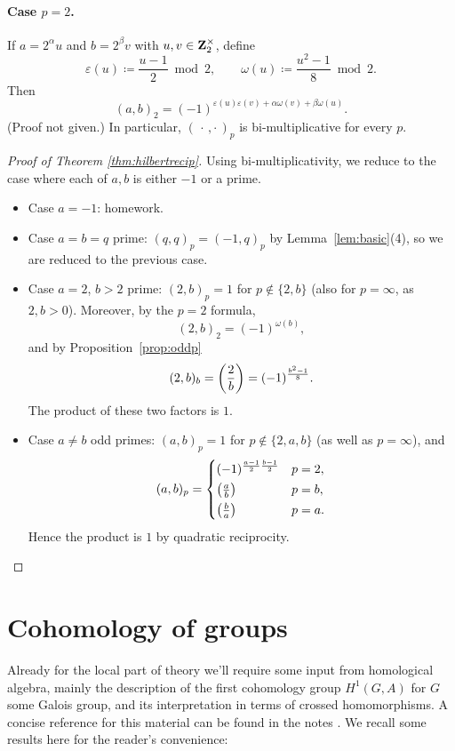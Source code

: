 \documentclass{article}
\begin{document}
\paragraph{Case $p=2$.}
If $a=2^\alpha u$ and $b=2^\beta v$ with $u,v\in\mathbf{Z}_2^\times$, define
\[
	\varepsilon(u)\coloneqq\frac{u-1}{2}\bmod 2,\qquad \omega(u)\coloneqq\frac{u^2-1}{8}\bmod 2.
\]
Then
\[
	(a,b)_2 = (-1)^{\varepsilon(u)\varepsilon(v)+\alpha\omega(v)+\beta\omega(u)}.
\]
(Proof not given.) In particular, $(\,\cdot\,,\cdot\,)_p$ is bi-multiplicative for every $p$.
\begin{proof}[Proof of Theorem \ref{thm:hilbertrecip}]
	Using bi-multiplicativity, we reduce to the case where each of $a,b$ is either $-1$ or a prime.
	\begin{itemize}
		\item Case $a=-1$: homework.
		\item Case $a=b=q$ prime: $(q,q)_p=(-1,q)_p$ by Lemma~\ref{lem:basic}(4), so we are reduced to the previous case.
		\item Case $a=2$, $b>2$ prime: $(2,b)_p=1$ for $p\notin\{2,b\}$ (also for $p=\infty$, as $2,b>0$). Moreover, by the $p=2$ formula,
		      \[
			      (2,b)_2=(-1)^{\omega(b)},
		      \]
		      and by Proposition~\ref{prop:oddp}
		      \[
			      (2,b)_b=\left(\frac{2}{b}\right)=(-1)^{\frac{b^2-1}{8}}.
		      \]
		      The product of these two factors is $1$.
		\item Case $a\neq b$ odd primes: $(a,b)_p=1$ for $p\notin\{2,a,b\}$ (as well as $p=\infty$), and
		      \[
			      (a,b)_p = \begin{cases}
				      (-1)^{\frac{a-1}{2}\frac{b-1}{2}} & p=2, \\[2pt]
				      \left(\frac{a}{b}\right)                   & p=b, \\[2pt]
				      \left(\frac{b}{a}\right)                   & p=a.
			      \end{cases}
		      \]
		      Hence the product is $1$ by quadratic reciprocity.\qedhere
	\end{itemize}
\end{proof}

\section{Cohomology of groups}
Already for the local part of theory we'll require some input from homological algebra, mainly the description of the first cohomology group $H^1(G,A)$ for $G$ some Galois group, and its interpretation in terms of crossed homomorphisms. A concise reference for this material can be found in the notes \cite{groupcohom}. We recall some results here for the reader's convenience:
\end{document}
